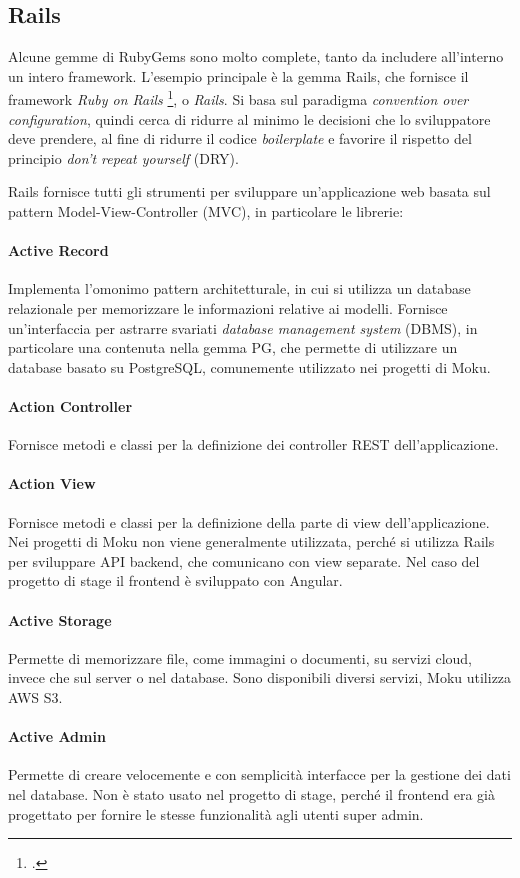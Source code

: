 \subsection{Rails}
Alcune gemme di RubyGems sono molto complete, tanto da includere all'interno un intero framework. L'esempio principale è la gemma Rails, che fornisce il framework \emph{Ruby on Rails} \footcite{site:rails}, o \emph{Rails}. Si basa sul paradigma \emph{convention over configuration}, quindi cerca di ridurre al minimo le decisioni che lo sviluppatore deve prendere, al fine di ridurre il codice \emph{boilerplate} e favorire il rispetto del principio \emph{don't repeat yourself} (DRY).

Rails fornisce tutti gli strumenti per sviluppare un'applicazione web basata sul pattern Model-View-Controller (MVC), in particolare le librerie:
\paragraph{Active Record} Implementa l'omonimo pattern architetturale, in cui si utilizza un database relazionale per memorizzare le informazioni relative ai modelli. Fornisce un'interfaccia per astrarre svariati \emph{database management system} (DBMS), in particolare una contenuta nella gemma PG, che permette di utilizzare un database basato su PostgreSQL, comunemente utilizzato nei progetti di Moku.
\paragraph{Action Controller} Fornisce metodi e classi per la definizione dei controller REST dell'applicazione.
\paragraph{Action View} Fornisce metodi e classi per la definizione della parte di view dell'applicazione. Nei progetti di Moku non viene generalmente utilizzata, perché si utilizza Rails per sviluppare API backend, che comunicano con view separate. Nel caso del progetto di stage il frontend è sviluppato con Angular.
\paragraph{Active Storage} Permette di memorizzare file, come immagini o documenti, su servizi cloud, invece che sul server o nel database. Sono disponibili diversi servizi, Moku utilizza AWS S3.
\paragraph{Active Admin} Permette di creare velocemente e con semplicità interfacce per la gestione dei dati nel database. Non è stato usato nel progetto di stage, perché il frontend era già progettato per fornire le stesse funzionalità agli utenti super admin.

